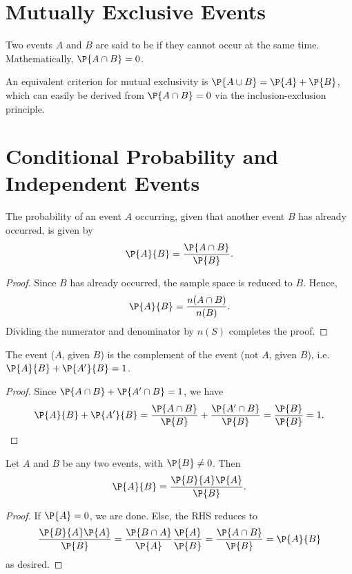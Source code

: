 \section{Mutually Exclusive Events}

\begin{definition}
    Two events $A$ and $B$ are said to be  if they cannot occur at the same time. Mathematically, $\P{A \cap B} = 0$.
\end{definition}

An equivalent criterion for mutual exclusivity is $\P{A \cup B} = \P{A} + \P{B}$, which can easily be derived from $\P{A \cap B} = 0$ via the inclusion-exclusion principle.

\section{Conditional Probability and Independent Events}

\begin{proposition}
    The probability of an event $A$ occurring, given that another event $B$ has already occurred, is given by \[\P{A}{B} = \frac{\P{A \cap B}}{\P{B}}.\]
\end{proposition}
\begin{proof}
    Since $B$ has already occurred, the sample space is reduced to $B$. Hence, \[\P{A}{B} = \frac{n(A \cap B)}{n(B)}.\] Dividing the numerator and denominator by $n(S)$ completes the proof.
\end{proof}

\begin{corollary}
    The event ($A$, given $B$) is the complement of the event (not $A$, given $B$), i.e. $\P{A}{B} + \P{A'}{B} = 1$.
\end{corollary}
\begin{proof}
    Since $\P{A \cap B} + \P{A' \cap B} = 1$, we have \[\P{A}{B} + \P{A'}{B} = \frac{\P{A \cap B}}{\P{B}} + \frac{\P{A' \cap B}}{\P{B}} = \frac{\P{B}}{\P{B}} = 1.\]
\end{proof}

\begin{theorem}
    Let $A$ and $B$ be any two events, with $\P{B} \neq 0$. Then \[\P{A}{B} = \frac{\P{B}{A} \P{A}}{\P{B}}.\]
\end{theorem}
\begin{proof}
    If $\P{A} = 0$, we are done. Else, the RHS reduces to \[\frac{\P{B}{A} \P{A}}{\P{B}} = \frac{\P{B \cap A}}{\P{A}} \frac{\P{A}}{\P{B}} = \frac{\P{A \cap B}}{\P{B}} = \P{A}{B}\] as desired.
\end{proof}

